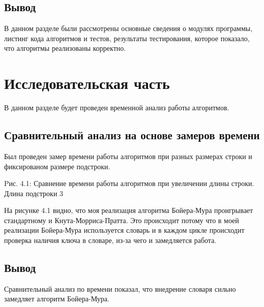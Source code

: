 \documentclass[12pt]{report}
\begin{document}
\section{Вывод}
В данном разделе были рассмотрены основные сведения о модулях программы, листинг кода алгоритмов и тестов, результаты тестирования, которое показало,  что алгоритмы реализованы корректно.


\chapter{Исследовательская часть}
В данном разделе будет проведен временной анализ работы алгоритмов.

\section{Сравнительный анализ на основе замеров времени}
Был проведен замер времени работы алгоритмов при разных размерах строки и фиксированом размере подстроки.

\begin{center}
Pис. 4.1: Сравнение времени работы алгоритмов при увеличении длины строки. Длина подстроки 3
\end{center}

На рисунке 4.1 видно, что моя реализация алгоритма Бойера-Мура проигрывает стандартному и Кнута-Морриса-Пратта.
Это происходит потому что в моей реализации Бойера-Мура используется словарь и в каждом цикле происходит проверка наличия ключа в словаре, из-за чего
и замедляется работа. 

\section*{Вывод}
Сравнительный анализ по времени показал, что внедрение словаря сильно замедляет алгоритм Бойера-Мура.
\end{document}
